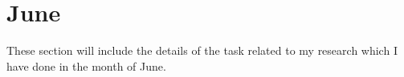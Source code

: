 \chapter{June}
\label{chap:Jun}


These section will include the details of the task related to my research which I have done in the month of June.






